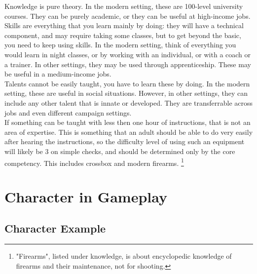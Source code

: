 \documentclass{LegrandOrangeTufteBook}
\newcommand{\term}[1]{\textcolor{colorTerm}{#1}}
\begin{document}


\term{Knowledge} is pure theory. In the modern setting, these are 100-level university courses. They can be purely academic, or they can be useful at high-income jobs.\\
\term{Skills} are everything that you learn mainly by doing:
they will have a technical component, and may require taking some classes, but to get beyond the basic, you need to keep using skills.
In the modern setting, think of everything you would learn in night classes, or by working with an individual, or with a coach or a trainer.
In other settings, they may be used through apprenticeship.
These may be useful in a medium-income jobs.\\
\term{Talents} cannot be easily taught, you have to learn these by doing.
In the modern setting, these are useful in social situations.
However, in other settings, they can include any other talent that is innate or developed.
They are transferrable across jobs and even different campaign settings.\\

If something can be taught with less then one hour of instructions, that is not an area of \term{expertise}.
This is something that an adult should be able to do very easily after hearing the instructions,
so the \term{difficulty level} of using such an equipment will likely be 3 on simple checks,
and should be determined only by the \term{core competency}.
This includes crossbox and modern firearms.
\footnote{"Firearms", listed under knowledge, is about encyclopedic knowledge of firearms and their maintenance, not for shooting.}





\section*{Character in Gameplay}

\subsection*{Character Example}
\end{document}
